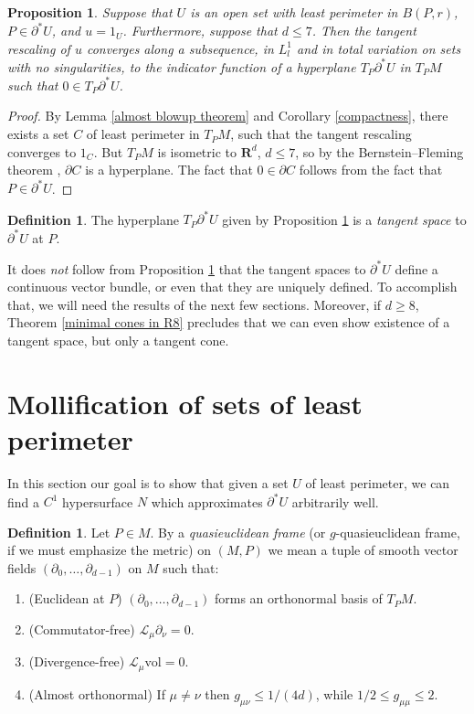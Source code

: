 \documentclass[reqno,12pt,letterpaper]{amsart}
\newcommand{\RR}{\mathbf{R}}
\newcommand{\vol}{\mathrm{vol}}
\newcommand{\dfn}[1]{\emph{#1}\index{#1}}
\newtheorem{proposition}[theorem]{Proposition}
\theoremstyle{definition}
\newtheorem{definition}[theorem]{Definition}
\numberwithin{equation}{section}
\begin{document}
\begin{proposition}\label{blowup theorem}
Suppose that $U$ is an open set with least perimeter in $B(P, r)$, $P \in \partial^* U$, and $u = 1_U$.
Furthermore, suppose that $d \leq 7$.
Then the tangent rescaling of $u$ converges along a subsequence, in $L^1_l$ and in total variation on sets with no singularities, to the indicator function of a hyperplane $T_P \partial^* U$ in $T_PM$ such that $0 \in T_P \partial^* U$.
\end{proposition}
\begin{proof}
By Lemma \ref{almost blowup theorem} and Corollary \ref{compactness}, there exists a set $C$ of least perimeter in $T_PM$, such that the tangent rescaling converges to $1_C$.
But $T_PM$ is isometric to $\RR^d$, $d \leq 7$, so by the Bernstein--Fleming theorem \cite[Theorem 17.3]{Giusti77} \cite[\S5]{Fleming62}, $\partial C$ is a hyperplane.
The fact that $0 \in \partial C$ follows from the fact that $P \in \partial^* U$.
\end{proof}

\begin{definition}
The hyperplane $T_P \partial^* U$ given by Proposition \ref{blowup theorem} is a \dfn{tangent space} to $\partial^* U$ at $P$.
\end{definition}

It does \emph{not} follow from Proposition \ref{blowup theorem} that the tangent spaces to $\partial^* U$ define a continuous vector bundle, or even that they are uniquely defined. To accomplish that, we will need the results of the next few sections.
Moreover, if $d \geq 8$, Theorem \ref{minimal cones in R8} precludes that we can even show existence of a tangent space, but only a tangent cone.


\section{Mollification of sets of least perimeter}\label{MollifierSection}
In this section our goal is to show that given a set $U$ of least perimeter, we can find a $C^1$ hypersurface $N$ which approximates $\partial^* U$ arbitrarily well.

\begin{definition}
Let $P \in M$.
By a \dfn{quasieuclidean frame} (or $g$-quasieuclidean frame, if we must emphasize the metric) on $(M, P)$ we mean a tuple of smooth vector fields $(\partial_0, \dots, \partial_{d - 1})$ on $M$ such that:
\begin{enumerate}
\item (Euclidean at $P$) $(\partial_0, \dots, \partial_{d - 1})$ forms an orthonormal basis of $T_PM$.
\item (Commutator-free) $\mathcal L_\mu \partial_\nu = 0$.
\item (Divergence-free) $\mathcal L_\mu \vol = 0$.
\item (Almost orthonormal) If $\mu \neq \nu$ then $g_{\mu\nu} \leq 1/(4d)$, while $1/2 \leq g_{\mu\mu} \leq 2$.
\end{enumerate}
\end{definition}
\end{document}
